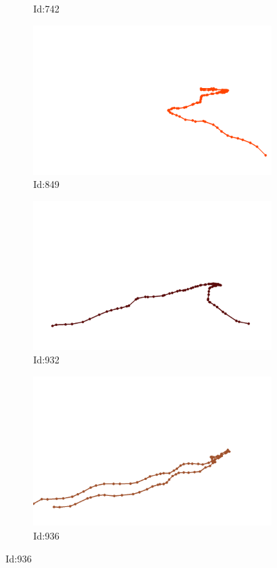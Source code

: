 \documentclass[12pt,twoside]{report}
\begin{document}
\begin{figure}
\begin{subfigure}[b]{0.20\textwidth}
\caption{Id:742}
\end{subfigure}
\begin{subfigure}[b]{0.20\textwidth}
\centering
\includegraphics[width=\textwidth]{../trajectories/849.png}
\caption{Id:849}
\end{subfigure}
\begin{subfigure}[b]{0.20\textwidth}
\centering
\includegraphics[width=\textwidth]{../trajectories/932.png}
\caption{Id:932}
\end{subfigure}
\begin{subfigure}[b]{0.20\textwidth}
\centering
\includegraphics[width=\textwidth]{../trajectories/936.png}
\caption{Id:936}
\end{subfigure}
\end{figure}
\end{document}

